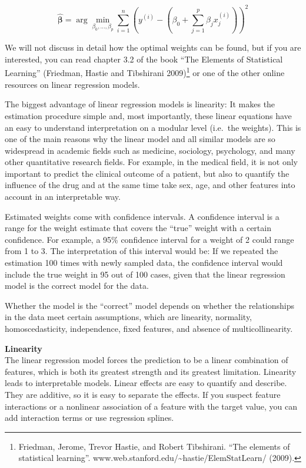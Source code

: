 \documentclass[12pt,]{krantz}
\begin{document}
\[\hat{\boldsymbol{\beta}}=\arg\!\min_{\beta_0,\ldots,\beta_p}\sum_{i=1}^n\left(y^{(i)}-\left(\beta_0+\sum_{j=1}^p\beta_jx^{(i)}_{j}\right)\right)^{2}\]

We will not discuss in detail how the optimal weights can be found, but
if you are interested, you can read chapter 3.2 of the book ``The
Elements of Statistical Learning'' (Friedman, Hastie and Tibshirani
2009)\footnote{Friedman, Jerome, Trevor Hastie, and Robert Tibshirani.
  ``The elements of statistical learning''.
  www.web.stanford.edu/\textasciitilde{}hastie/ElemStatLearn/ (2009).}
or one of the other online resources on linear regression models.

The biggest advantage of linear regression models is linearity: It makes
the estimation procedure simple and, most importantly, these linear
equations have an easy to understand interpretation on a modular level
(i.e.~the weights). This is one of the main reasons why the linear model
and all similar models are so widespread in academic fields such as
medicine, sociology, psychology, and many other quantitative research
fields. For example, in the medical field, it is not only important to
predict the clinical outcome of a patient, but also to quantify the
influence of the drug and at the same time take sex, age, and other
features into account in an interpretable way.

Estimated weights come with confidence intervals. A confidence interval
is a range for the weight estimate that covers the ``true'' weight with
a certain confidence. For example, a 95\% confidence interval for a
weight of 2 could range from 1 to 3. The interpretation of this interval
would be: If we repeated the estimation 100 times with newly sampled
data, the confidence interval would include the true weight in 95 out of
100 cases, given that the linear regression model is the correct model
for the data.

Whether the model is the ``correct'' model depends on whether the
relationships in the data meet certain assumptions, which are linearity,
normality, homoscedasticity, independence, fixed features, and absence
of multicollinearity.

\textbf{Linearity}\\
The linear regression model forces the prediction to be a linear
combination of features, which is both its greatest strength and its
greatest limitation. Linearity leads to interpretable models. Linear
effects are easy to quantify and describe. They are additive, so it is
easy to separate the effects. If you suspect feature interactions or a
nonlinear association of a feature with the target value, you can add
interaction terms or use regression splines.
\end{document}
